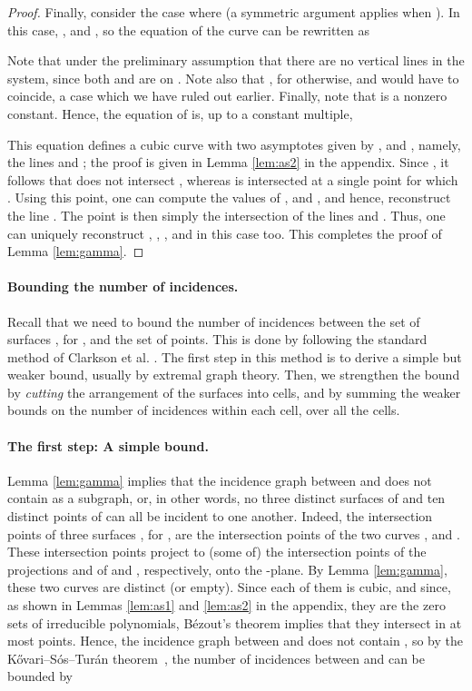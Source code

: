 \documentclass[12pt]{article}
\begin{document}
\begin{proof}
Finally, consider the case where  (a symmetric argument
applies when ).
In this case, , and , so the
equation of the curve  can be rewritten as

Note that  under the preliminary assumption that there
are no vertical lines in the system, since both 
and  are on .
Note also that , for otherwise,
 and  would have to coincide, a case which we
have ruled out earlier.
Finally, note that  is a nonzero constant.
Hence, the equation of  is, up to a constant multiple,

This equation defines a cubic curve with two asymptotes given by
, and , namely, the lines  and ;
the proof is given in Lemma \ref{lem:as2} in the appendix.
Since , it follows that
 does not intersect , whereas  is
intersected at a single point  for which .
Using this point, one can compute the values of , and
, and hence, reconstruct the line .
The point  is then simply the intersection of the lines 
and . Thus, one can uniquely reconstruct , ,
, and  in this case too.
This completes the proof of Lemma \ref{lem:gamma}.
\end{proof}

\paragraph{Bounding the number of incidences.}
Recall that we need to bound the number of incidences between the set
 of surfaces , for ,
and the set  of points. This is done by following the standard
method of Clarkson et al. \cite{CEGSW}.
The first step in this method is to derive a simple but weaker
bound, usually by extremal graph theory. Then, we strengthen the bound
by {\em cutting} the arrangement of the surfaces into cells, and by
summing the weaker bounds on the number of incidences within each cell,
over all the cells.

\paragraph{The first step: A simple bound.}
Lemma \ref{lem:gamma} implies that the incidence graph between 
and  does not contain  as a subgraph, or,
in other words, no three distinct surfaces of  and ten distinct
points of  can all be incident to one another. Indeed, the
intersection points of three surfaces , for
, are the intersection points of the two curves
, and
. These
intersection points project to (some of) the intersection points of the
projections  and  of 
and , respectively, onto the -plane.
By Lemma \ref{lem:gamma}, these two curves are distinct (or empty).
Since each of them is cubic, and since, as shown in Lemmas \ref{lem:as1}
and \ref{lem:as2} in the appendix, they are the zero sets of irreducible
polynomials,
B\'ezout's theorem \cite{Sha} implies that
they intersect in at most  points.
Hence, the incidence graph between  and  does not
contain , so
by the K\H{o}vari--S\'os--Tur\'an theorem~\cite{KST54}, the
number of incidences between  and  can be bounded by
\end{document}
